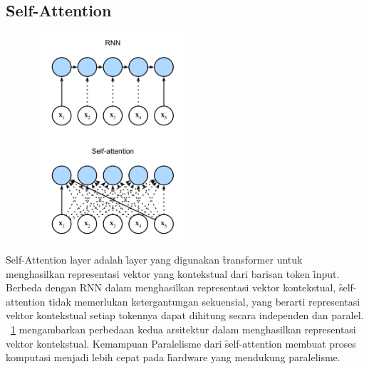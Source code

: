 	\subsection{\f{Self-Attention}}
	\begin{figure}
		\centering
		\includegraphics[width=0.5\textwidth]{assets/pics/rnn-compare-selfattention.png}
		\label{fig:self-attention-rnn}
	\end{figure}

	\f{Self-Attention layer} adalah \f{layer} yang digunakan \f{transformer} untuk menghasilkan representasi vektor yang kontekstual dari barisan token \f{input}. Berbeda dengan RNN dalam menghasilkan representasi vektor kontekstual, \f{self-attention} tidak memerlukan ketergantungan sekuensial, yang berarti representasi vektor kontekstual setiap tokennya dapat dihitung secara independen dan paralel. \pic~\ref{fig:self-attention-rnn} mengambarkan perbedaan kedua arsitektur dalam menghasilkan representasi vektor kontekstual. Kemampuan Paralelisme dari \f{self-attention} membuat proses komputasi menjadi lebih cepat pada \f{hardware} yang mendukung paralelisme. 

